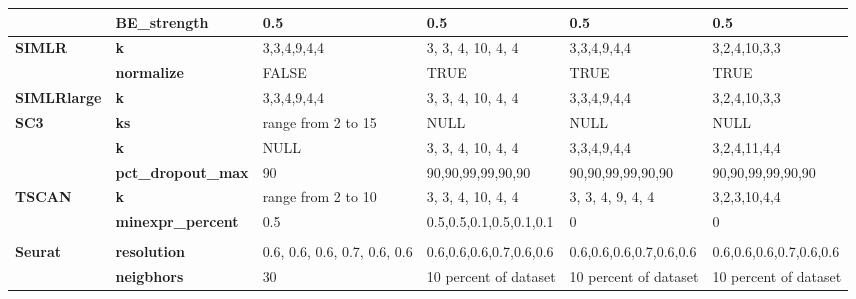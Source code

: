 \documentclass[12pt, a4paper]{article}\usepackage[]{graphicx}\usepackage[]{color}
\begin{document}
\begin{table}[htbp]
{\begin{tabular}{rp{5.585em}llll}
          & \textbf{BE\_strength} & 0.5   & 0.5   & 0.5   & 0.5 \\
    \midrule
    \multicolumn{1}{l}{\textbf{SIMLR}} & \textbf{k} & \multicolumn{1}{p{13.335em}}{3,3,4,9,4,4} & \multicolumn{1}{p{10.165em}}{3, 3, 4, 10, 4, 4} & \multicolumn{1}{p{9.085em}}{3,3,4,9,4,4} & \multicolumn{1}{p{9.835em}}{3,2,4,10,3,3} \\
          & \textbf{normalize} & \multicolumn{1}{p{13.335em}}{FALSE} & \multicolumn{1}{p{10.165em}}{TRUE} & \multicolumn{1}{p{9.085em}}{TRUE} & \multicolumn{1}{p{9.835em}}{TRUE} \\
    \midrule
    \multicolumn{1}{l}{\textbf{SIMLRlarge}} & \textbf{k} & \multicolumn{1}{p{13.335em}}{3,3,4,9,4,4} & \multicolumn{1}{p{10.165em}}{3, 3, 4, 10, 4, 4} & \multicolumn{1}{p{9.085em}}{3,3,4,9,4,4} & \multicolumn{1}{p{9.835em}}{3,2,4,10,3,3} \\
    \midrule
    \multicolumn{1}{l}{\textbf{SC3}} & \textbf{ks} & \multicolumn{1}{p{13.335em}}{range from 2 to 15} & \multicolumn{1}{p{10.165em}}{NULL} & \multicolumn{1}{p{9.085em}}{NULL} & \multicolumn{1}{p{9.835em}}{NULL} \\
          & \textbf{k} & \multicolumn{1}{p{13.335em}}{NULL} & \multicolumn{1}{p{10.165em}}{3, 3, 4, 10, 4, 4} & \multicolumn{1}{p{9.085em}}{3,3,4,9,4,4} & \multicolumn{1}{p{9.835em}}{3,2,4,11,4,4} \\
          & \textbf{pct\_dropout\_max} & 90    & \multicolumn{1}{p{10.165em}}{90,90,99,99,90,90} & \multicolumn{1}{p{9.085em}}{90,90,99,99,90,90} & \multicolumn{1}{p{9.835em}}{90,90,99,99,90,90} \\
    \midrule
    \multicolumn{1}{l}{\textbf{TSCAN}} & \textbf{k} & \multicolumn{1}{p{13.335em}}{range from 2 to 10} & \multicolumn{1}{p{10.165em}}{3, 3, 4, 10, 4, 4} & \multicolumn{1}{p{9.085em}}{3, 3, 4, 9, 4, 4} & \multicolumn{1}{p{9.835em}}{3,2,3,10,4,4} \\
          & \textbf{minexpr\_percent} & 0.5   & \multicolumn{1}{p{10.165em}}{0.5,0.5,0.1,0.5,0.1,0.1} & 0     & 0 \\
          & \multicolumn{1}{l}{} &       &       &       &  \\
    \midrule
    \multicolumn{1}{l}{\textbf{Seurat}} & \textbf{resolution} & \multicolumn{1}{p{13.335em}}{0.6, 0.6, 0.6, 0.7, 0.6, 0.6} & \multicolumn{1}{p{10.165em}}{0.6,0.6,0.6,0.7,0.6,0.6} & \multicolumn{1}{p{9.085em}}{0.6,0.6,0.6,0.7,0.6,0.6} & \multicolumn{1}{p{9.835em}}{0.6,0.6,0.6,0.7,0.6,0.6} \\
          & \textbf{neigbhors} & 30    & \multicolumn{1}{p{10.165em}}{10 percent of dataset} & \multicolumn{1}{p{9.085em}}{10 percent of dataset} & \multicolumn{1}{p{9.835em}}{10 percent of dataset} \\

\end{tabular}}
\end{table}
\end{document}
